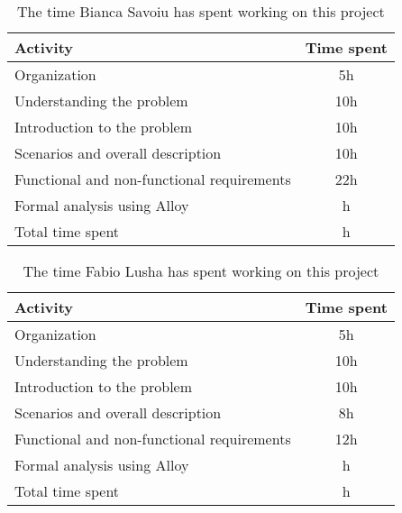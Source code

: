 \label{sec:Effort spent}%
\begin{table}[h!]
    \centering
    \begin{tabular}{|l|c|}
     \hline
     \textbf{Activity} & \textbf{Time spent} \\
    \hline
    Organization & 5h \\
    \hline
    Understanding the problem & 10h \\
    \hline
    Introduction to the problem & 10h \\
    \hline
    Scenarios and overall description & 10h \\
    \hline
    Functional and non-functional requirements & 22h \\
    \hline
    Formal analysis using Alloy & h \\
    \hline
    Total time spent & h \\
    \hline
\end{tabular}
    \caption{The time Bianca Savoiu has spent working on this project}
    \label{tab:Assumptions}
\end{table}


\begin{table}[h!]
    \centering
    \begin{tabular}{|l|c|}
    \hline
     \textbf{Activity} & \textbf{Time spent} \\
    \hline
    Organization & 5h \\
    \hline
    Understanding the problem & 10h \\
    \hline
    Introduction to the problem & 10h \\
    \hline
    Scenarios and overall description & 8h \\
    \hline
    Functional and non-functional requirements & 12h \\
    \hline
    Formal analysis using Alloy & h \\
    \hline
    Total time spent & h \\
    \hline
\end{tabular}
    \caption{The time Fabio Lusha has spent working on this project}
    \label{tab:Assumptions}
\end{table}